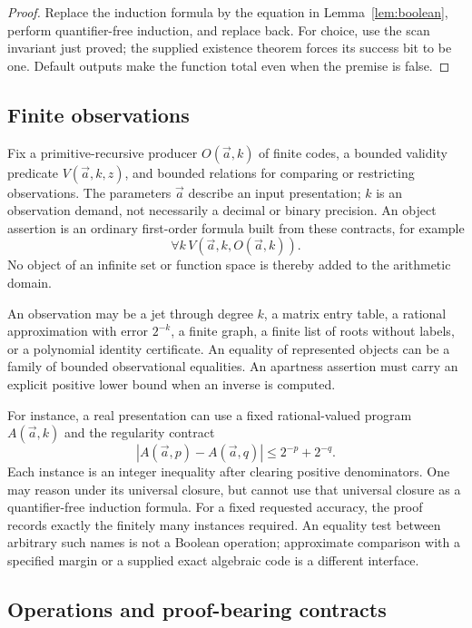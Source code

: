 \begin{proof}
Replace the induction formula by the equation in
Lemma~\ref{lem:boolean}, perform quantifier-free induction, and replace
back. For choice, use the scan invariant just proved; the supplied
existence theorem forces its success bit to be one. Default outputs
make the function total even when the premise is false.
\end{proof}

\subsection{Finite observations}

\begin{definition}
Fix a primitive-recursive producer \(O(\vec a,k)\) of finite codes,
a bounded validity predicate \(V(\vec a,k,z)\), and bounded relations
for comparing or restricting observations. The parameters \(\vec a\)
describe an input presentation; \(k\) is an observation demand, not
necessarily a decimal or binary precision. An object assertion is an
ordinary first-order formula built from these contracts, for example
\[
   \forall k\,V(\vec a,k,O(\vec a,k)).
\]
No object of an infinite set or function space is thereby added to the
arithmetic domain.
\end{definition}

An observation may be a jet through degree \(k\), a matrix entry table,
a rational approximation with error \(2^{-k}\), a finite graph, a finite
list of roots without labels, or a polynomial identity certificate.
An equality of represented objects can be a family of bounded
observational equalities. An apartness assertion must carry an explicit
positive lower bound when an inverse is computed.

For instance, a real presentation can use a fixed rational-valued
program \(A(\vec a,k)\) and the regularity contract
\[
 |A(\vec a,p)-A(\vec a,q)|\le 2^{-p}+2^{-q}.
\]
Each instance is an integer inequality after clearing positive
denominators. One may reason under its universal closure, but cannot use
that universal closure as a quantifier-free induction formula. For a
fixed requested accuracy, the proof records exactly the finitely many
instances required. An equality test between arbitrary such names is
not a Boolean operation; approximate comparison with a specified margin
or a supplied exact algebraic code is a different interface.

\subsection{Operations and proof-bearing contracts}

